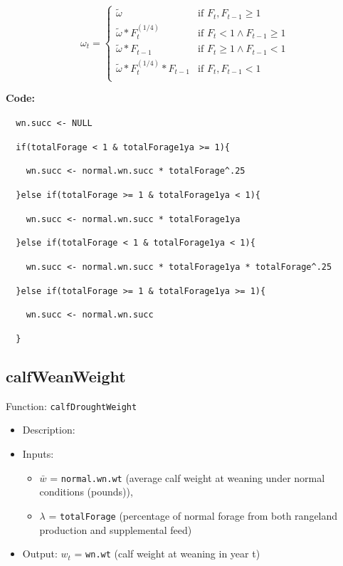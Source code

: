 \documentclass[11pt]{article}
\begin{document}
\begin{equation}
\omega_t =
\begin{cases}
\tilde{\omega}  &\text{if } F_{t}, F_{t-1} \ge 1  \\
\tilde{\omega} * F_{t}^{(1/4)} &\text{if } F_{t} < 1 \land F_{t-1} \ge 1 \\
\tilde{\omega} * F_{t - 1} &\text{if } F_{t} \ge 1 \land F_{t-1} < 1 \\
\tilde{\omega} * F_{t}^{(1/4)} * F_{t-1} &\text{if } F_{t}, F_{t-1} < 1 \\
\end{cases}
\end{equation}

\vspace{.25in}
\textbf{Code:}

\verb!  wn.succ <- NULL!

\verb!  if(totalForage < 1 & totalForage1ya >= 1){!

\verb!    wn.succ <- normal.wn.succ * totalForage^.25!

\verb!  }else if(totalForage >= 1 & totalForage1ya < 1){!

\verb!    wn.succ <- normal.wn.succ * totalForage1ya!

\verb!  }else if(totalForage < 1 & totalForage1ya < 1){!

\verb!    wn.succ <- normal.wn.succ * totalForage1ya * totalForage^.25!

\verb!  }else if(totalForage >= 1 & totalForage1ya >= 1){!

\verb!    wn.succ <- normal.wn.succ!

\verb!  }!


\subsection{calfWeanWeight}
Function: \verb!calfDroughtWeight!
	\begin{itemize}
	\item Description:
	\item Inputs: 
		\begin{itemize}
		\item $\bar{w}$ = \verb!normal.wn.wt! (average calf weight at weaning under normal conditions (pounds)), 
		\item $\lambda$ = \verb!totalForage! (percentage of normal forage from both rangeland production and supplemental feed)
		\end{itemize} 
	\item Output: $w_t$ = \verb!wn.wt! (calf weight at weaning in year t)
	\end{itemize}
\end{document}
